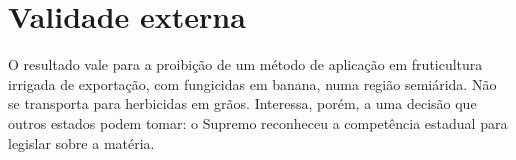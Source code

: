 \section{Validade externa}

O resultado vale para a proibição de um método de aplicação em fruticultura
irrigada de exportação, com fungicidas em banana, numa região semiárida. Não se
transporta para herbicidas em grãos. Interessa, porém, a uma decisão que outros
estados podem tomar: o Supremo reconheceu a competência estadual para legislar
sobre a matéria.

